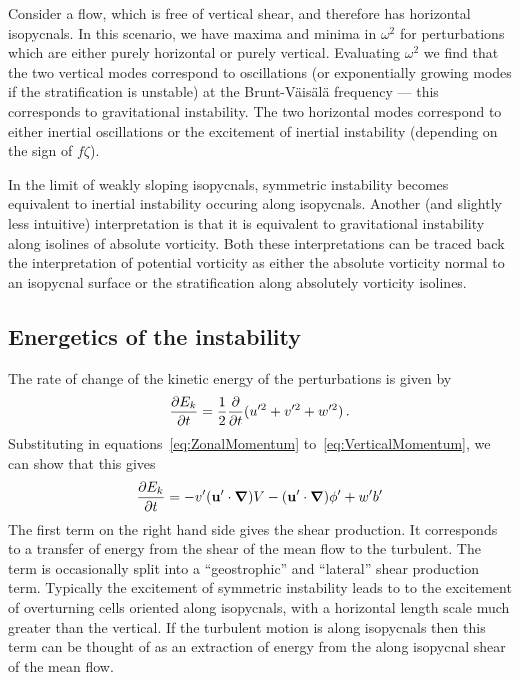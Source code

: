     Consider a flow, which is free of vertical shear, and therefore has horizontal isopycnals. In this scenario, we have maxima and minima in $\omega^2$ for perturbations which are either purely horizontal or purely vertical. Evaluating $\omega^2$ we find that the two vertical modes correspond to oscillations (or exponentially growing modes if the stratification is unstable) at the Brunt-V\"ais\"al\"a frequency --- this corresponds to gravitational instability. The two horizontal modes correspond to either inertial oscillations or the excitement of inertial instability (depending on the sign of $f \zeta$).

    In the limit of weakly sloping isopycnals, symmetric instability becomes equivalent to inertial instability occuring along isopycnals. Another (and slightly less intuitive) interpretation is that it is equivalent to gravitational instability along isolines of absolute vorticity. Both these interpretations can be traced back the interpretation of potential vorticity as either the absolute vorticity normal to an isopycnal surface or the stratification along absolutely vorticity isolines.
    
    \subsection{Energetics of the instability}
    The rate of change of the kinetic energy of the perturbations is given by
    \begin{equation}
        \label{eq:TurbulentKE}
        \pdv{E_k}{t} = \frac{1}{2}\frac{\partial}{\partial t} (u'^2 + v'^2 + w'^2) \, .
    \end{equation}
    Substituting in equations~\ref{eq:ZonalMomentum} to~\ref{eq:VerticalMomentum}, we can show that this gives
    \begin{equation}
        \pdv{E_k}{t} = - v' (\mathbf{u}'\cdot \grad) V - (\mathbf{u}'\cdot \grad) \phi ' + w' b' 
    \end{equation}
    The first term on the right hand side gives the shear production. It corresponds to a transfer of energy from the shear of the mean flow to the turbulent. The term is occasionally split into a ``geostrophic'' and ``lateral'' shear production term. Typically the excitement of symmetric instability leads to to the excitement of overturning cells oriented along isopycnals, with a horizontal length scale much greater than the vertical. If the turbulent motion is along isopycnals then this term can be thought of as an extraction of energy from the along isopycnal shear of the mean flow.
    
